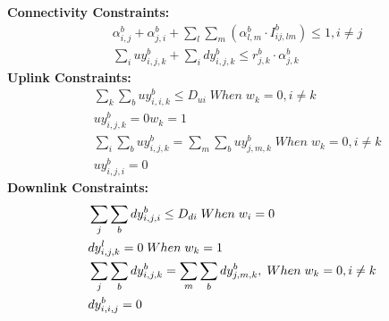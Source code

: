 \noindent
{\bf Connectivity Constraints:}
\begin{align}
\label{opt:1}
& \alpha_{i,j}^b + \alpha_{j,i}^b + \sum_l\sum_m(\alpha_{l,m}^b \cdot I_{ij,lm}^b) \leq 1, i\neq j \\
\label{opt:2}
& \sum_i uy_{i,j,k}^b + \sum_i dy_{i,j,k}^b \leq r_{j,k}^b \cdot \alpha_{j,k}^b 
\end{align}
\noindent
{\bf Uplink Constraints:} 
\begin{align}
\label{opt:3}
& \sum_k \sum_b uy_{i,i,k}^b \leq D_{ui} \; When \; w_k=0, i \neq k \\
\label{opt:4}
& uy_{i,j,k}^b = 0 w_k=1 \\
\label{opt:6}
& \sum_i\sum_b uy_{i,j,k}^b = \sum_m \sum_b uy_{j,m,k}^b \; When \; w_k=0, i \neq k\\
\label{opt:7}
& uy_{i,j,i}^b=0 
\end{align}
\noindent
{\bf Downlink Constraints:} 
\begin{align}
{\bf}
\label{opt:8}
& \sum_j \sum_b dy_{i,j,i}^b \leq D_{di} \; When \; w_i=0 \\
\label{opt:9}
& dy_{i,j,k}^l =0 \; When \; w_k=1 \\
\label{opt:11}
& \sum_j\sum_b dy_{i,j,k}^b = \sum_m \sum_b dy_{j,m,k}^b,\; When \; w_k=0,  i \neq k \\
\label{opt:12}
& dy_{i,i,j}^b=0
\end{align}

